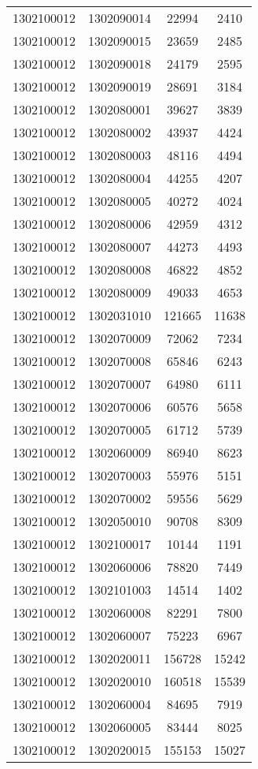 \begin{longtable}{llcc}
1302100012 & 1302090014 & 22994 & 2410\\
1302100012 & 1302090015 & 23659 & 2485\\
1302100012 & 1302090018 & 24179 & 2595\\
1302100012 & 1302090019 & 28691 & 3184\\
1302100012 & 1302080001 & 39627 & 3839\\
1302100012 & 1302080002 & 43937 & 4424\\
1302100012 & 1302080003 & 48116 & 4494\\
1302100012 & 1302080004 & 44255 & 4207\\
1302100012 & 1302080005 & 40272 & 4024\\
1302100012 & 1302080006 & 42959 & 4312\\
1302100012 & 1302080007 & 44273 & 4493\\
1302100012 & 1302080008 & 46822 & 4852\\
1302100012 & 1302080009 & 49033 & 4653\\
1302100012 & 1302031010 & 121665 & 11638\\
1302100012 & 1302070009 & 72062 & 7234\\
1302100012 & 1302070008 & 65846 & 6243\\
1302100012 & 1302070007 & 64980 & 6111\\
1302100012 & 1302070006 & 60576 & 5658\\
1302100012 & 1302070005 & 61712 & 5739\\
1302100012 & 1302060009 & 86940 & 8623\\
1302100012 & 1302070003 & 55976 & 5151\\
1302100012 & 1302070002 & 59556 & 5629\\
1302100012 & 1302050010 & 90708 & 8309\\
1302100012 & 1302100017 & 10144 & 1191\\
1302100012 & 1302060006 & 78820 & 7449\\
1302100012 & 1302101003 & 14514 & 1402\\
1302100012 & 1302060008 & 82291 & 7800\\
1302100012 & 1302060007 & 75223 & 6967\\
1302100012 & 1302020011 & 156728 & 15242\\
1302100012 & 1302020010 & 160518 & 15539\\
1302100012 & 1302060004 & 84695 & 7919\\
1302100012 & 1302060005 & 83444 & 8025\\
1302100012 & 1302020015 & 155153 & 15027\\

\end{longtable}
